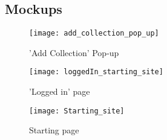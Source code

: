 \subsection{Mockups}\label{subsec:Mockups}

\begin{figure}[htbp]
    \centering
    \texttt{[image: add\_collection\_pop\_up]}
    \caption{'Add Collection' Pop-up}
\end{figure}

\begin{figure}[htbp]
    \centering
    \texttt{[image: loggedIn\_starting\_site]}
    \caption{'Logged in' page}
\end{figure}

\begin{figure}[htbp]
    \centering
    \texttt{[image: Starting\_site]}
    \caption{Starting page}
\end{figure}
